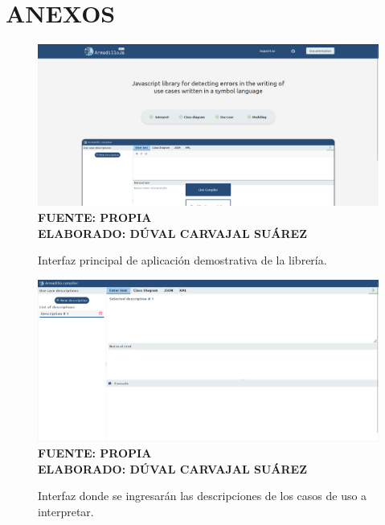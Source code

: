 \setcounter{chapter}{6}
\setcounter{section}{0}
\part{ANEXOS}

\begin{figure}[H]
	\caption{Interfaz principal de aplicación demostrativa de la librería.}
	\includegraphics[width=15cm]{img/anexo1.png}
	\label{fig:anexo1}
	\textbf{\\ FUENTE: PROPIA \\ ELABORADO: DÚVAL CARVAJAL SUÁREZ}
\end{figure} 

\begin{figure}[H]
	\caption{Interfaz donde se ingresarán las descripciones de los casos de uso a interpretar.}
	\includegraphics[width=15cm]{img/anexo2.png}
	\label{fig:anexo2}
	\textbf{\\ FUENTE: PROPIA \\ ELABORADO: DÚVAL CARVAJAL SUÁREZ}
\end{figure} 

